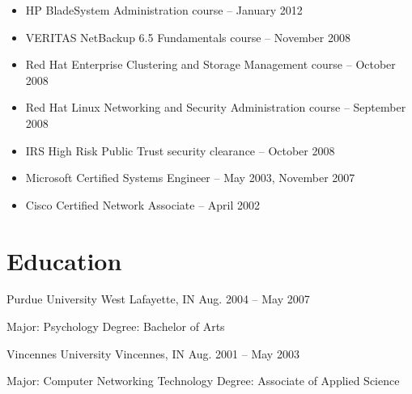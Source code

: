 \documentclass[9pt]{extarticle} %
\begin{document}
\begin{indented}
	\begin{itemize}
		\item HP BladeSystem Administration course -- January 2012
		\item VERITAS NetBackup 6.5 Fundamentals course -- November 2008
		\item Red Hat Enterprise Clustering and Storage Management course -- October 2008
		\item Red Hat Linux Networking and Security Administration course -- September 2008
		\item IRS High Risk Public Trust security clearance -- October 2008
		\item Microsoft Certified Systems Engineer -- May 2003, November 2007
		\item Cisco Certified Network Associate -- April 2002
	\end{itemize}
\end{indented}


\section{Education}

Purdue University \tab West Lafayette, IN \tab Aug. 2004 -- May 2007\\
\begin{indented}
	Major: Psychology \tabto{8cm} Degree: Bachelor of Arts
\end{indented}

\bigskip


Vincennes University \tab Vincennes, IN \tab Aug. 2001 -- May 2003\\
\begin{indented}
	Major: Computer Networking Technology \tabto{8cm} Degree: Associate of Applied Science
\end{indented}

\end{document}
